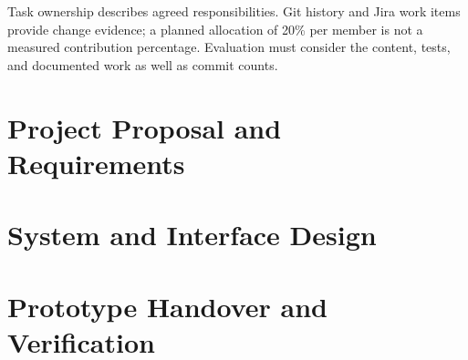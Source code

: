 \documentclass[a4paper,11pt,oneside]{book}
\begin{document}
Task ownership describes agreed responsibilities. Git history and Jira work
items provide change evidence; a planned allocation of 20\% per member is not
a measured contribution percentage. Evaluation must consider the content,
tests, and documented work as well as commit counts.

{\small\tableofcontents}
\listoffigures
\listoftables
\mainmatter
\chapter{Project Proposal and Requirements}








\clearpage
\chapter{System and Interface Design}



\clearpage

\clearpage

\clearpage
\chapter{Prototype Handover and Verification}

\clearpage

\clearpage

\end{document}
